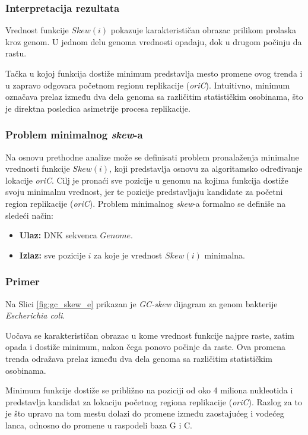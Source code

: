 \documentclass[12pt,oneside]{memoir}
\begin{document}
\subsubsection{Interpretacija rezultata}

Vrednost funkcije $Skew(i)$ pokazuje karakterističan obrazac prilikom prolaska kroz genom. U jednom delu genoma vrednosti opadaju, dok u drugom počinju da rastu.

Tačka u kojoj funkcija dostiže minimum predstavlja mesto promene ovog trenda i u zapravo odgovara početnom regionu replikacije (\textit{oriC}). Intuitivno, minimum označava prelaz između dva dela genoma sa različitim statističkim osobinama, što je direktna posledica asimetrije procesa replikacije.

\subsubsection{Problem minimalnog \textit{skew}-a}

Na osnovu prethodne analize može se definisati problem pronalaženja minimalne vrednosti funkcije $Skew(i)$, koji predstavlja osnovu za algoritamsko određivanje lokacije \textit{oriC}. Cilj je pronaći sve pozicije u genomu na kojima funkcija dostiže svoju minimalnu vrednost, jer te pozicije predstavljaju kandidate za početni region replikacije (\textit{oriC}). Problem minimalnog \textit{skew}-a formalno se definiše na sledeći način:
\begin{itemize}
\item\textbf{Ulaz:} DNK sekvenca $Genome$.

\item\textbf{Izlaz:} sve pozicije $i$ za koje je vrednost $Skew(i)$ minimalna.
\end{itemize}

\subsubsection{Primer}

Na Slici \ref{fig:gc_skew_e} prikazan je \textit{GC-skew} dijagram za genom bakterije \textit{Escherichia coli}. 

Uočava se karakterističan obrazac u kome vrednost funkcije najpre raste, zatim opada i dostiže minimum, nakon čega ponovo počinje da raste. Ova promena trenda odražava prelaz između dva dela genoma sa različitim statističkim osobinama.

Minimum funkcije dostiže se približno na poziciji od oko 4 miliona nukleotida i predstavlja kandidat za lokaciju početnog regiona replikacije (\textit{oriC}). Razlog za to je što upravo na tom mestu dolazi do promene između zaostajućeg i vodećeg lanca, odnosno do promene u raspodeli baza G i C.
\end{document}
